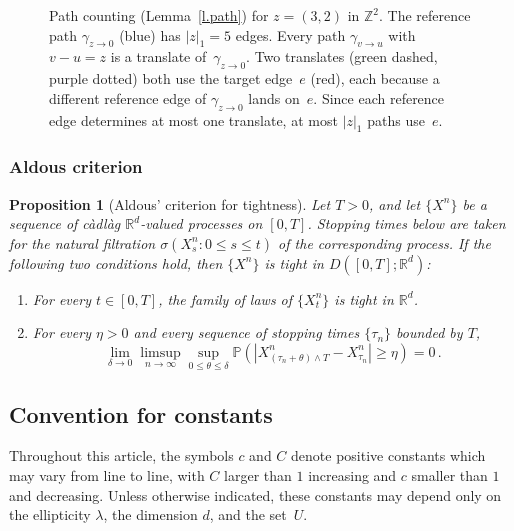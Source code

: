 \documentclass[11pt]{amsart}
\theoremstyle{plain}
\newtheorem{proposition}[theorem]{Proposition}
\theoremstyle{definition}
\theoremstyle{remark}
\newcommand{\Rd}{\mathbb{R}^d}
\newcommand{\Z}{\mathbb{Z}}
\renewcommand{\P}{\mathbb{P}}
\begin{document}
\begin{figure}[ht]
		\caption{Path counting (Lemma~\ref{l.path}) for $z = (3,2)$ in $\Z^2$.
			The reference path $\gamma_{z \to 0}$ (blue) has $|z|_1 = 5$ edges.
			Every path $\gamma_{v \to u}$ with $v - u = z$ is a translate of~$\gamma_{z \to 0}$.
			Two translates (green dashed, purple dotted) both use the target edge~$e$ (red), each because a different reference edge of $\gamma_{z \to 0}$ lands on~$e$.
			Since each reference edge determines at most one translate, at most $|z|_1$ paths use~$e$.}
		\label{fig:pathcount}
	\end{figure}
	
	
	\subsubsection{Aldous criterion} \label{sec:aldouscriterion}
	
	\begin{proposition}[Aldous' criterion for tightness]
		Let $T > 0$, and let $\{X^n\}$ be a sequence of c\`adl\`ag $\Rd$-valued processes on $[0,T]$.
		Stopping times below are taken for the natural filtration $\sigma(X^n_s:0\le s\le t)$ of the corresponding process.
		If the following two conditions hold, then $\{X^n\}$ is tight in $D([0,T]; \Rd)$:
		\begin{enumerate}
			\item For every $t \in [0,T]$, the family of laws of $\{X^n_t\}$ is tight in $\Rd$.
			\item For every $\eta > 0$ and every sequence of stopping times $\{\tau_n\}$ bounded by $T$,
			\[
			\lim_{\delta \to 0} \limsup_{n \to \infty} \sup_{0 \le \theta \le \delta} \P\left( |X^n_{(\tau_n + \theta) \wedge T} - X^n_{\tau_n}| \ge \eta \right) = 0\,.
			\]
		\end{enumerate}
	\end{proposition}
	
	\subsection{Convention for constants} Throughout this article, the symbols $c$ and $C$ denote positive constants which may vary from line to line, with $C$ larger than $1$ increasing and $c$ smaller than $1$ and decreasing. Unless otherwise indicated, these constants may depend only on the ellipticity $\lambda$, the dimension $d$, and the set~$U$.
	
\end{document}
